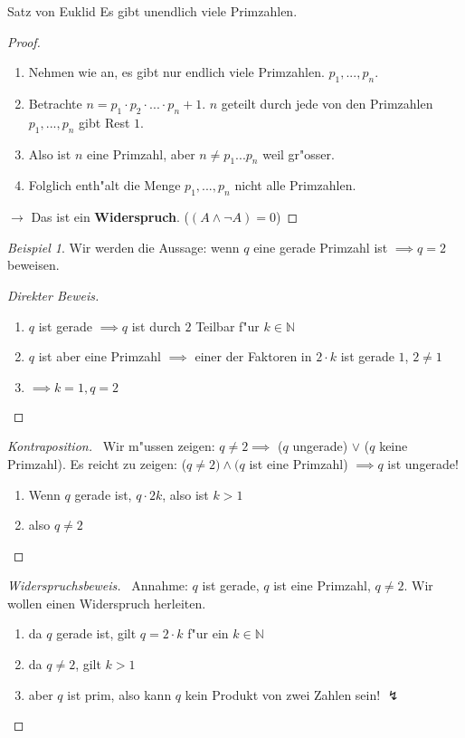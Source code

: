 \documentclass[11pt]{article}
\theoremstyle{remark}
\newtheorem{exa}{Beispiel}[section]
\theoremstyle{definition}
\theoremstyle{remark}
\begin{document}
\begin{theo}{Satz von Euklid}{}
Es gibt unendlich viele Primzahlen.
\end{theo}

\begin{proof}\
\begin{enumerate}
\item Nehmen wie an, es gibt nur endlich viele Primzahlen. \(p_1, ..., p_n\).
\item Betrachte \(n=p_1\cdot p_2\cdot ... \cdot p_n + 1\). \(n\) geteilt durch jede
von den Primzahlen \(p_1, ..., p_n\) gibt Rest \(1\).
\item Also ist \(n\) eine Primzahl, aber \(n\not=p_1 ... p_n\) weil gr"osser.
\item Folglich enth"alt die Menge \({p_1,...,p_n}\) nicht alle Primzahlen.
\end{enumerate}
\indent\indent \(\rightarrow\) Das ist ein \textbf{Widerspruch}. (\((A\wedge \neg A) = 0\))
\end{proof}


\begin{exa}
Wir werden die Aussage: wenn \(q\) eine gerade Primzahl ist \(\implies q=2\)
beweisen.

\begin{proof}[Direkter Beweis] \label{} \
\begin{enumerate}
\item \(q\) ist gerade \(\implies q\) ist durch \(2\) Teilbar f"ur \(k\in\mathbb{N}\)
\item \(q\) ist aber eine Primzahl \(\implies\) einer der Faktoren in \(2\cdot k\) ist
gerade \(1\), \(2\not= 1\)
\item \(\implies k=1, q=2\)
\end{enumerate}
\end{proof}

\begin{proof}[Kontraposition] \label{} \
Wir m"ussen zeigen: \(q\not= 2\implies\) (\(q\) ungerade) \(\vee\) (\(q\) keine
Primzahl). Es reicht zu zeigen: (\(q\not=2)\wedge(q\) ist eine Primzahl)
\(\implies q\) ist ungerade!
\begin{enumerate}
\item Wenn \(q\) gerade ist, \(q\cdot 2k\), also ist \(k>1\)
\item also \(q\not= 2\)
\end{enumerate}
\end{proof}

\begin{proof}[Widerspruchsbeweis] \label{} \
Annahme: \(q\) ist gerade, \(q\) ist eine Primzahl, \(q\not= 2\). Wir wollen einen
Widerspruch herleiten.

\begin{enumerate}
\item da \(q\) gerade ist, gilt \(q=2\cdot k\) f"ur ein \(k\in \mathbb{N}\)
\item da \(q\not= 2\), gilt \(k>1\)
\item aber \(q\) ist prim, also kann \(q\) kein Produkt von zwei Zahlen sein! \(\lightning\)
\end{enumerate}
\end{proof}
\end{exa}
\end{document}
